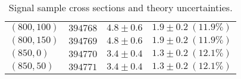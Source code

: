 \begin{table}[h]
\begin{center}
\begin{tabular}{|l|c|c|c|}
$(800,100)$ & $394768$ & $4.8\pm0.6$ & $1.9\pm0.2~(11.9\%)$ \\
$(800,150)$ & $394769$ & $4.8\pm0.6$ & $1.9\pm0.2~(11.9\%)$ \\
$(850,0)$ & $394770$ & $3.4\pm0.4$ & $1.3\pm0.2~(12.1\%)$ \\
$(850,50)$ & $394771$ & $3.4\pm0.4$ & $1.3\pm0.2~(12.1\%)$ \\
\bottomrule
\end{tabular}
\caption{Signal sample cross sections and theory uncertainties.}
\label{tab:signal-xsec}
\end{center}
\end{table}
